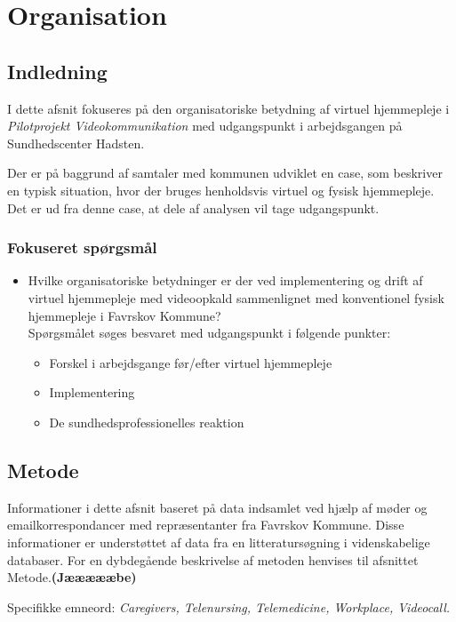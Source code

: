 \chapter{Organisation}

\section{Indledning}
I dette afsnit fokuseres på den organisatoriske betydning af virtuel hjemmepleje i \textit{Pilotprojekt Videokommunikation} med udgangspunkt i arbejdsgangen på Sundhedscenter Hadsten. 

Der er på baggrund af samtaler med kommunen udviklet en case, som beskriver en typisk situation, hvor der bruges henholdsvis virtuel og fysisk hjemmepleje. Det er ud fra denne case, at dele af analysen vil tage udgangspunkt.

\subsection{Fokuseret spørgsmål}

\begin{itemize}
	\item Hvilke organisatoriske betydninger er der ved implementering og drift af virtuel hjemmepleje med videoopkald sammenlignet med konventionel fysisk hjemmepleje i Favrskov Kommune? \\Spørgsmålet søges besvaret med udgangspunkt i følgende punkter:
	\begin{itemize}
	\item Forskel i arbejdsgange før/efter virtuel hjemmepleje
	\item Implementering
	\item De sundhedsprofessionelles reaktion
\end{itemize}
\end{itemize}


\section{Metode}
Informationer i dette afsnit baseret på data indsamlet ved hjælp af møder og emailkorrespondancer med repræsentanter fra Favrskov Kommune. Disse informationer er understøttet af data fra en litteratursøgning i videnskabelige databaser. For en dybdegående beskrivelse af metoden henvises til afsnittet Metode.\textbf{(Jæææææbe)} 

Specifikke emneord: \textit{Caregivers, Telenursing, Telemedicine, Workplace, Videocall.}

